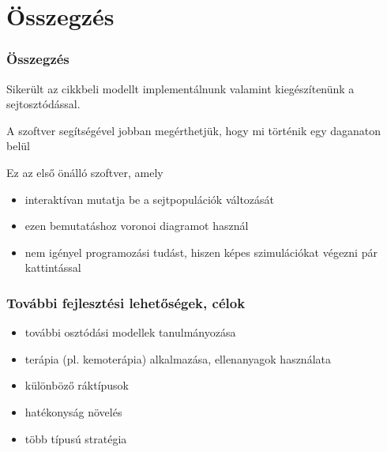 \section{Összegzés}
\begin{frame}
\frametitle{Összegzés}

\begin{block}{}
Sikerült az \cite{archetti2016cooperation} cikkbeli modellt implementálnunk valamint kiegészítenünk a sejtosztódással.
\end{block}
\begin{block}{}
A szoftver segítségével jobban megérthetjük, hogy mi történik egy daganaton belül
\end{block}

\pause
\begin{block}{Ez az első önálló szoftver, amely}
\begin{itemize}
	\item interaktívan mutatja be a sejtpopulációk változását
	\pause
	\item ezen bemutatáshoz voronoi diagramot használ
	\pause
	\item nem igényel programozási tudást, hiszen képes szimulációkat végezni pár kattintással
\end{itemize}
\end{block}
\end{frame}

\begin{frame}
\frametitle{További fejlesztési lehetőségek, célok}
\begin{itemize}
	\item további osztódási modellek tanulmányozása
	\item terápia (pl. kemoterápia) alkalmazása, ellenanyagok használata
	\item különböző ráktípusok
	\item hatékonyság növelés
	\item több típusú stratégia
\end{itemize}

\end{frame}